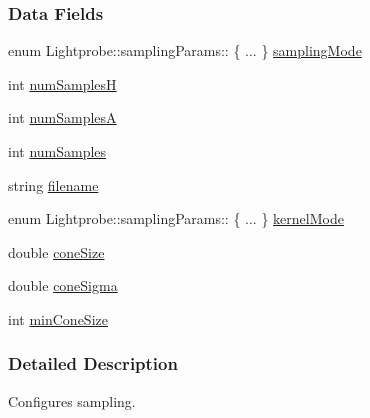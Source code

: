 \subsubsection*{\-Data \-Fields}
\begin{DoxyCompactItemize}
\item 
enum \*
\-Lightprobe\-::sampling\-Params\-:: \{ ... \}  \hyperlink{structLightprobe_1_1samplingParams_a17c0ba049f772f82f9b907677b0a9e98}{sampling\-Mode}
\item 
int \hyperlink{structLightprobe_1_1samplingParams_ab1d05a9134ccba831a1c36a3dcb5996b}{num\-Samples\-H}
\item 
int \hyperlink{structLightprobe_1_1samplingParams_af76ea83942b934a35009230fa3c052c8}{num\-Samples\-A}
\item 
int \hyperlink{structLightprobe_1_1samplingParams_ab0383fbf2d829a489bec6e898263a93c}{num\-Samples}
\item 
string \hyperlink{structLightprobe_1_1samplingParams_a67d8e234278ac136217898a25dfd7a04}{filename}
\item 
enum \*
\-Lightprobe\-::sampling\-Params\-:: \{ ... \}  \hyperlink{structLightprobe_1_1samplingParams_a84c7b8ac61a3eca06ec9946043d582ea}{kernel\-Mode}
\item 
double \hyperlink{structLightprobe_1_1samplingParams_a40d7bda09f3ac27e1e723e515abe0237}{cone\-Size}
\item 
double \hyperlink{structLightprobe_1_1samplingParams_ae23881a169622e07dd07c9d6f9271642}{cone\-Sigma}
\item 
int \hyperlink{structLightprobe_1_1samplingParams_a88702442b01a17db68afc178f4197a2f}{min\-Cone\-Size}
\end{DoxyCompactItemize}


\subsubsection{\-Detailed \-Description}
\-Configures sampling. 

